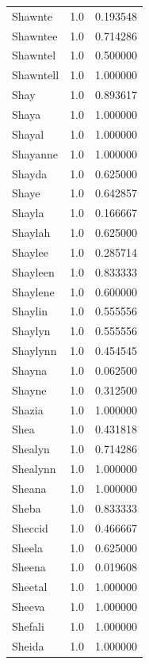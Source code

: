 \documentclass[
  letterpaper,
  DIV=11,
  numbers=noendperiod]{scrreprt}
\begin{document}
\begin{tabular}{lrr}
Shawnte         &   1.0 &   0.193548 \\
Shawntee        &   1.0 &   0.714286 \\
Shawntel        &   1.0 &   0.500000 \\
Shawntell       &   1.0 &   1.000000 \\
Shay            &   1.0 &   0.893617 \\
Shaya           &   1.0 &   1.000000 \\
Shayal          &   1.0 &   1.000000 \\
Shayanne        &   1.0 &   1.000000 \\
Shayda          &   1.0 &   0.625000 \\
Shaye           &   1.0 &   0.642857 \\
Shayla          &   1.0 &   0.166667 \\
Shaylah         &   1.0 &   0.625000 \\
Shaylee         &   1.0 &   0.285714 \\
Shayleen        &   1.0 &   0.833333 \\
Shaylene        &   1.0 &   0.600000 \\
Shaylin         &   1.0 &   0.555556 \\
Shaylyn         &   1.0 &   0.555556 \\
Shaylynn        &   1.0 &   0.454545 \\
Shayna          &   1.0 &   0.062500 \\
Shayne          &   1.0 &   0.312500 \\
Shazia          &   1.0 &   1.000000 \\
Shea            &   1.0 &   0.431818 \\
Shealyn         &   1.0 &   0.714286 \\
Shealynn        &   1.0 &   1.000000 \\
Sheana          &   1.0 &   1.000000 \\
Sheba           &   1.0 &   0.833333 \\
Sheccid         &   1.0 &   0.466667 \\
Sheela          &   1.0 &   0.625000 \\
Sheena          &   1.0 &   0.019608 \\
Sheetal         &   1.0 &   1.000000 \\
Sheeva          &   1.0 &   1.000000 \\
Shefali         &   1.0 &   1.000000 \\
Sheida          &   1.0 &   1.000000 \\

\end{tabular}
\end{document}
